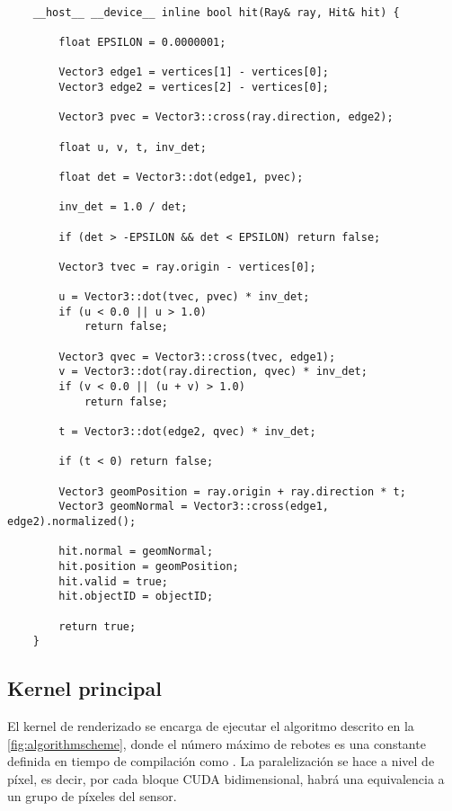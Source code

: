 \begin{minipage}[c]{0.95\textwidth}
\begin{lstlisting}[label={cod:triintersection}, caption={Adaptación de código Fast Minimum Storage Ray/Triangle Intersection\cite{moller1997fast} a Eleven Renderer}]
	
	__host__ __device__ inline bool hit(Ray& ray, Hit& hit) {

		float EPSILON = 0.0000001;

        Vector3 edge1 = vertices[1] - vertices[0];
        Vector3 edge2 = vertices[2] - vertices[0];

        Vector3 pvec = Vector3::cross(ray.direction, edge2);

        float u, v, t, inv_det;

        float det = Vector3::dot(edge1, pvec);

        inv_det = 1.0 / det;

        if (det > -EPSILON && det < EPSILON) return false;

        Vector3 tvec = ray.origin - vertices[0];

        u = Vector3::dot(tvec, pvec) * inv_det;
        if (u < 0.0 || u > 1.0)
            return false;

        Vector3 qvec = Vector3::cross(tvec, edge1);
        v = Vector3::dot(ray.direction, qvec) * inv_det;
        if (v < 0.0 || (u + v) > 1.0)
            return false;

        t = Vector3::dot(edge2, qvec) * inv_det;

        if (t < 0) return false;

        Vector3 geomPosition = ray.origin + ray.direction * t;
		Vector3 geomNormal = Vector3::cross(edge1, edge2).normalized();
		
		hit.normal = geomNormal;
		hit.position = geomPosition;
		hit.valid = true;
		hit.objectID = objectID;

        return true;
	}

\end{lstlisting}
\end{minipage}

\subsection{Kernel principal}
	
El kernel de renderizado  se encarga de ejecutar el algoritmo descrito en la \autoref{fig:algorithmscheme}, donde el número máximo de rebotes es una constante definida en tiempo de compilación como . La paralelización se hace a nivel de píxel, es decir, por cada bloque CUDA bidimensional, habrá una equivalencia a un grupo de píxeles del sensor.

